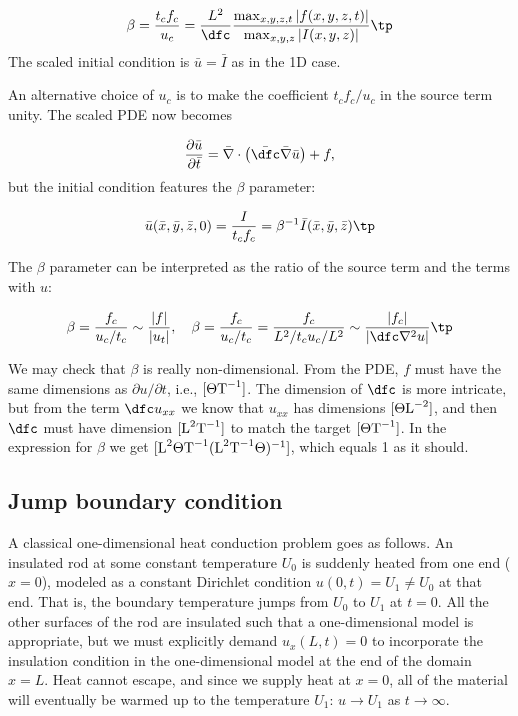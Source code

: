 \documentclass[graybox,envcountchap,sectrefs,final]{svmonodo}
\begin{document}
\[ \beta = \frac{t_cf_c}{u_c} = \frac{L^2}{\dfc}
\frac{\max_{x,y,z,t}|f(x,y,z,t)|}{\max_{x,y,z}|I(x,y,z)|}\tp\]
The scaled initial condition is $\bar u = \bar I$ as in the 1D case.

An alternative choice of $u_c$ is to make the coefficient $t_cf_c/u_c$
in the source term unity. The scaled PDE now becomes

\begin{equation}
\frac{\partial \bar u}{\partial \bar t} =
\bar\nabla\cdot\left(\bar\dfc \bar\nabla \bar u\right) + f,
\label{sec:scale:diffu:pde1:3D:d2}
\end{equation}
but the initial condition features the $\beta$ parameter:

\[ \bar u(\bar x, \bar y, \bar z, 0) = \frac{I}{t_cf_c} =
\beta^{-1}\bar I(\bar x,\bar y,\bar z)\tp
\]

The $\beta$ parameter can be interpreted as the ratio of the source
term and the terms with $u$:

\[ \beta = \frac{f_c}{u_c/t_c}\sim \frac{|f|}{|u_t|},\quad
\beta = \frac{f_c}{u_c/t_c} = \frac{f_c}{L^2/t_c u_c/L^2}\sim
\frac{|f_c|}{|\dfc\nabla^2 u|}\tp
\]

We may check that $\beta$ is really non-dimensional. From the PDE,
$f$ must have the same dimensions as $\partial u/\partial t$, i.e.,
$[\Theta\hbox{T}^{-1}]$.
The dimension of $\dfc$ is more intricate, but from the term
$\dfc u_{xx}$ we know that $u_{xx}$ has dimensions $[\Theta\hbox{L}^{-2}]$,
and then $\dfc$ must have dimension $[\hbox{L}^2\hbox{T}^{-1}]$
to match the target $[\Theta\hbox{T}^{-1}]$.
In the expression for $\beta$ we get
$[\hbox{L}^2\Theta\hbox{T}^{-1}(\hbox{L}^2\hbox{T}^{-1}\Theta)^{-1}]$,
which equals 1 as it should.


\subsection{Jump boundary condition}

A classical one-dimensional heat conduction problem goes as
follows. An insulated rod at some constant temperature $U_0$ is
suddenly heated from one end ($x=0$), modeled as a constant Dirichlet
condition $u(0,t)=U_1\neq U_0$ at that end. That is, the boundary
temperature jumps from $U_0$ to $U_1$ at $t=0$. All the other surfaces
of the rod are insulated such that a one-dimensional model is
appropriate, but we must explicitly demand $u_x(L,t)=0$ to incorporate
the insulation condition in the one-dimensional model at the end
of the domain $x=L$.  Heat cannot
escape, and since we supply heat at $x=0$, all of the material will
eventually be warmed up to the temperature $U_1$: $u\rightarrow U_1$
as $t\rightarrow\infty$.
\end{document}
